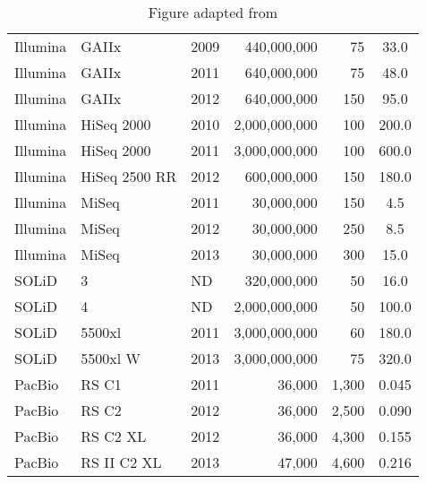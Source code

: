 \begin{table}[t]
{\begin{tabular}{lllrrS[table-format=3.2]}
Illumina   & GAIIx           & 2009 & 440,000,000     & 75                            & 33.0                        \\
Illumina   & GAIIx           & 2011 & 640,000,000     & 75                            & 48.0                        \\
Illumina   & GAIIx           & 2012 & 640,000,000     & 150                           & 95.0                        \\
Illumina   & HiSeq 2000      & 2010 & 2,000,000,000    & 100                           & 200.0                       \\
Illumina   & HiSeq 2000      & 2011 & 3,000,000,000    & 100                           & 600.0                       \\
Illumina   & HiSeq 2500 RR   & 2012 & 600,000,000     & 150                           & 180.0                       \\
Illumina   & MiSeq           & 2011 & 30,000,000      & 150                           & 4.5                       \\
Illumina   & MiSeq           & 2012 & 30,000,000      & 250                           & 8.5                       \\
Illumina   & MiSeq           & 2013 & 30,000,000      & 300                           & 15.0                        \\
SOLiD      & 3               & ND   & 320,000,000     & 50                            & 16.0                        \\
SOLiD      & 4               & ND   & 2,000,000,000    & 50                            & 100.0                       \\
SOLiD      & 5500xl          & 2011 & 3,000,000,000    & 60                            & 180.0                       \\
SOLiD      & 5500xl W        & 2013 & 3,000,000,000    & 75                            & 320.0                       \\
PacBio     & RS C1           & 2011 & 36,000         & 1,300                          & 0.045                     \\
PacBio     & RS C2           & 2012 & 36,000         & 2,500                          & 0.090                     \\
PacBio     & RS C2 XL        & 2012 & 36,000         & 4,300                          & 0.155                     \\
PacBio     & RS II C2 XL     & 2013 & 47,000         & 4,600                          & 0.216                    \\
\bottomrule
\end{tabular}}
\caption[Current HTS Sequencing Platforms]{Figure adapted from \citep{developmentinNGS:2012bs}}
\label{tab:table3_1}
\end{table}